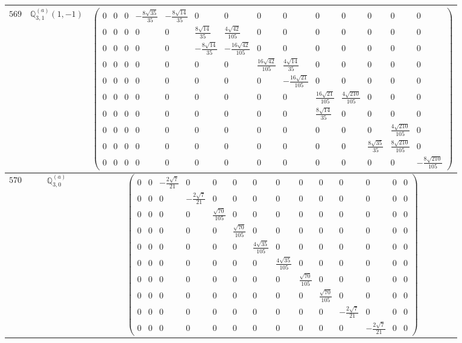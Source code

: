\documentclass[fleqn,8pt,landscape]{jsarticle}
\begin{document}
\begin{center}
\begin{longtable}{ccc}
$ 569 $ & $ \mathbb{Q}_{3,1}^{(a)}(1,-1) $ & $ \begin{pmatrix} 0 & 0 & 0 & - \frac{8 \sqrt{35}}{35} & - \frac{8 \sqrt{14}}{35} & 0 & 0 & 0 & 0 & 0 & 0 & 0 & 0 & 0 \\ 0 & 0 & 0 & 0 & 0 & \frac{8 \sqrt{14}}{35} & \frac{4 \sqrt{42}}{105} & 0 & 0 & 0 & 0 & 0 & 0 & 0 \\ 0 & 0 & 0 & 0 & 0 & - \frac{8 \sqrt{14}}{35} & - \frac{16 \sqrt{42}}{105} & 0 & 0 & 0 & 0 & 0 & 0 & 0 \\ 0 & 0 & 0 & 0 & 0 & 0 & 0 & \frac{16 \sqrt{42}}{105} & \frac{4 \sqrt{14}}{35} & 0 & 0 & 0 & 0 & 0 \\ 0 & 0 & 0 & 0 & 0 & 0 & 0 & 0 & - \frac{16 \sqrt{21}}{105} & 0 & 0 & 0 & 0 & 0 \\ 0 & 0 & 0 & 0 & 0 & 0 & 0 & 0 & 0 & \frac{16 \sqrt{21}}{105} & \frac{4 \sqrt{210}}{105} & 0 & 0 & 0 \\ 0 & 0 & 0 & 0 & 0 & 0 & 0 & 0 & 0 & \frac{8 \sqrt{14}}{35} & 0 & 0 & 0 & 0 \\ 0 & 0 & 0 & 0 & 0 & 0 & 0 & 0 & 0 & 0 & 0 & 0 & \frac{4 \sqrt{210}}{105} & 0 \\ 0 & 0 & 0 & 0 & 0 & 0 & 0 & 0 & 0 & 0 & 0 & \frac{8 \sqrt{35}}{35} & \frac{8 \sqrt{210}}{105} & 0 \\ 0 & 0 & 0 & 0 & 0 & 0 & 0 & 0 & 0 & 0 & 0 & 0 & 0 & - \frac{8 \sqrt{210}}{105} \end{pmatrix} $ \\ \hline
$ 570 $ & $ \mathbb{Q}_{3,0}^{(a)} $ & $ \begin{pmatrix} 0 & 0 & - \frac{2 \sqrt{7}}{21} & 0 & 0 & 0 & 0 & 0 & 0 & 0 & 0 & 0 & 0 & 0 \\ 0 & 0 & 0 & - \frac{2 \sqrt{7}}{21} & 0 & 0 & 0 & 0 & 0 & 0 & 0 & 0 & 0 & 0 \\ 0 & 0 & 0 & 0 & \frac{\sqrt{70}}{105} & 0 & 0 & 0 & 0 & 0 & 0 & 0 & 0 & 0 \\ 0 & 0 & 0 & 0 & 0 & \frac{\sqrt{70}}{105} & 0 & 0 & 0 & 0 & 0 & 0 & 0 & 0 \\ 0 & 0 & 0 & 0 & 0 & 0 & \frac{4 \sqrt{35}}{105} & 0 & 0 & 0 & 0 & 0 & 0 & 0 \\ 0 & 0 & 0 & 0 & 0 & 0 & 0 & \frac{4 \sqrt{35}}{105} & 0 & 0 & 0 & 0 & 0 & 0 \\ 0 & 0 & 0 & 0 & 0 & 0 & 0 & 0 & \frac{\sqrt{70}}{105} & 0 & 0 & 0 & 0 & 0 \\ 0 & 0 & 0 & 0 & 0 & 0 & 0 & 0 & 0 & \frac{\sqrt{70}}{105} & 0 & 0 & 0 & 0 \\ 0 & 0 & 0 & 0 & 0 & 0 & 0 & 0 & 0 & 0 & - \frac{2 \sqrt{7}}{21} & 0 & 0 & 0 \\ 0 & 0 & 0 & 0 & 0 & 0 & 0 & 0 & 0 & 0 & 0 & - \frac{2 \sqrt{7}}{21} & 0 & 0 \end{pmatrix} $ \\ \hline

\end{longtable}
\end{center}
\end{document}
